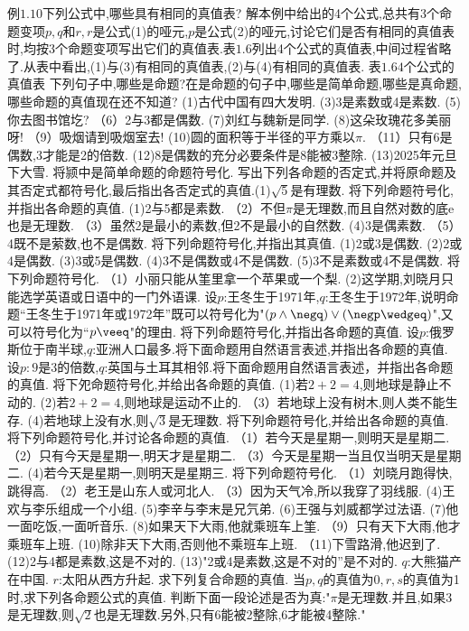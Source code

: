 {例$1.10$下列公式中,哪些具有相同的真值表?
解本例中给出的4个公式,总共有3个命题变项$p,q$和$r,r$是公式(1)的哑元,$p$是公式(2)的哑元,讨论它们是否有相同的真值表时,均按3个命题变项写出它们的真值表.表$1.6$列出4个公式的真值表,中间过程省略了.从表中看出,(1)与(3)有相同的真值表,(2)与(4)有相同的真值表.
表$1.64$个公式的真值表
下列句子中,哪些是命题?在是命题的句子中,哪些是简单命题,哪些是真命题,哪些命题的真值现在还不知道?
(1)古代中国有四大发明.
(3)3是素数或4是素数.
(5)你去图书馆圪?
（6）2与3都是偶数.
(7)刘红与魏新是同学.
(8)这朵玫瑰花多美丽呀!
（9）吸烟请到吸烟室去!
(10)圆的面积等于半径的平方乘以$\pi$.
（11）只有6是偶数,3才能是2的倍数.
(12)8是偶数的充分必要条件是8能被3整除.
(13)2025年元旦下大雪.
将颕中是简单命题的命题符号化.
写出下列各命题的否定式,并将原命题及其否定式都符号化,最后指出各否定式的真值.(1)$\sqrt{5}$是有理数.
将下列命题符号化,并指出各命题的真值.
(1)2与5都是素数.
（2）不但$\pi$是无理数,而且自然对数的底$\mathrm{e}$也是无理数.
（3）虽然2是最小的素数,但2不是最小的自然数.
(4)3是偶素数.
（5）4既不是萦数,也不是偶数.
将下列命题符号化,并指出其真值.
(1)2或3是偶数.
(2)2或4是偶数.
(3)3或5是偶数.
(4)3不是偶数或4不是偶数.
(5)3不是素数或4不是偶数.
将下列命题符号化.
（1）小丽只能从筀里拿一个苹果或一个梨.
(2)这学期,刘晓月只能选学英语或日语中的一门外语课.
设$p$:王冬生于1971年,$q$:王冬生于1972年,说明命题“王冬生于1971年或1972年”既可以符号化为"$(p\wedge\negq)\vee(\negp\wedgeq)$",又可以符号化为“$p\veeq$"的理由.
将下列命题符号化,并指出各命题的真值.
设$p$:俄罗斯位于南半球,$q$:亚洲人口最多.将下面命题用自然语言表述,并指出各命题的真值.
设$p:9$是3的倍数,$q$:英国与土耳其相邻.将下面命题用自然语言表述，并指出各命题的真值.
将下夗命题符号化,并给出各命题的真值.
(1)若$2+2=4$,则地球是静止不动的.
(2)若$2+2=4$,则地球是运动不止的.
（3）若地球上没有树木,则人类不能生存.
(4)若地球上没有水,则$\sqrt{3}$是无理数.
将下列命题符号化,并给出各命题的真值.
将下列命题符号化,并讨论各命题的真值.
（1）若今天是星期一,则明天是星期二.
（2）只有今天是星期一,明天才是星期二.
（3）今天是星期一当且仅当明天是星期二.
(4)若今天是星期一,则明天是星期三.
将下列命题符号化.
（1）刘晓月跑得快,跳得高.
（2）老王是山东人或河北人.
（3）因为天气冷,所以我穿了羽线服.
(4)王欢与李乐组成一个小组.
(5)李辛与李末是兄氕弟.
(6)王强与刘威都学过法语.
(7)他一面吃饭,一面听音乐.
(8)如果天下大雨,他就乘班车上筀.
（9）只有天下大雨,他才乘班车上班.
(10)除非天下大雨,否则他不乘班车上班.
（11)下雪路滑,他迟到了.
(12)2与4都是素数,这是不对的.
(13)"2或4是素数,这是不对的”是不对的.
$q$:大熊猫产在中国.
$r$:太阳从西方升起.
求下列复合命题的真值.
当$p,q$的真值为$0,r,s$的真值为1时,求下列各命题公式的真值.
判断下面一段论述是否为真:"$\pi$是无理数.并且,如果3是无理数,则$\sqrt{2}$也是无理数.另外,只有6能被2整除,6才能被4整除."
}
